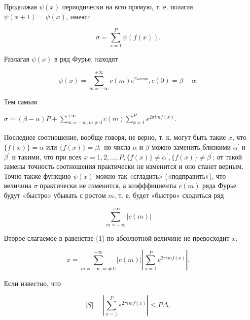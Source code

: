 \documentclass[10pt]{article}
\begin{document}
Продолжая $\psi(x)$ периодически на всю прямую, т. е. полагая $\psi(x+1)=\psi(x)$, имеют



\[

\sigma=\sum_{x=1}^{P} \psi(f(x)) .

\]



Разлагая $\psi(x)$ в ряд Фурье, находят



\[

\psi(x)=\sum_{m=-\infty}^{+\infty} c(m) e^{2 \pi i m x}, c(0)=\beta-\alpha .

\]



Тем самым



$\sigma=(\beta-\alpha) P+\sum_{m=-\infty, m \neq 0}^{+\infty} c(m) \sum_{x=1}^{P} e^{2 \pi i m f(x)}$.



Последнее соотношение, вообще говоря, не верно, т. к. могут быть такие $x$, что $\{f(x)\}=\alpha$ или $\{f(x)\}=\beta ;$ но числа $\alpha$ и $\beta$ можно заменить близкими $\alpha^{\prime}$ и $\beta^{\prime}$ и такими, что при всех $x=1,2, \ldots, P,\{f(x)\} \neq \alpha^{\prime},\{f(x)\} \neq \beta^{\prime}$; от такой замены точность соотношения практически не изменится и оно станет верным. Точно также функцию $\psi(x)$ можно так «сгладить» («подправить»), что величина $\sigma$ практически не изменится, а коэфффициенты $c(m)$ ряда Фурье будут «быстро» убывать с ростом $m$, т. е. будет «быстро» сходиться ряд



\[

\sum_{m=-\infty}^{+\infty}|c(m)|

\]



Второе слагаемое в равенстве (1) по абсолютной величине не превосходит $x$,



\[

x=\sum_{m=-\infty, m \neq 0}^{+\infty}|c(m)|\left|\sum_{x=1}^{P} e^{2 \pi i m f(x)}\right| .

\]



Если известно, что



\[

|S|=\left|\sum_{x=1}^{P} e^{2 \pi i m f(x)}\right| \leqslant P \Delta,

\]
\end{document}
